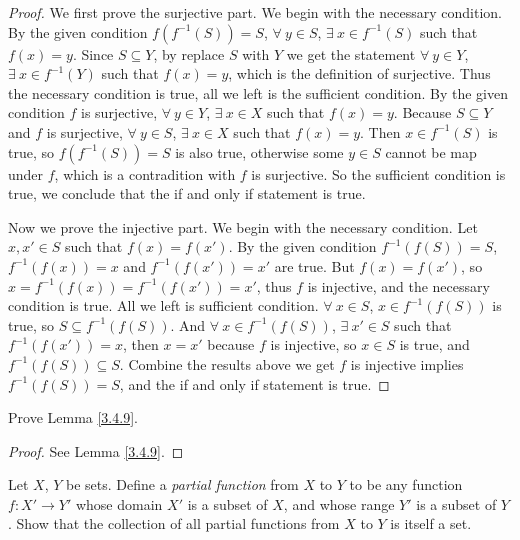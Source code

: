\begin{proof}
We first prove the surjective part.
We begin with the necessary condition.
By the given condition \(f(f^{-1}(S)) = S\), \(\forall\ y \in S\), \(\exists\ x \in f^{-1}(S)\) such that \(f(x) = y\).
Since \(S \subseteq Y\), by replace \(S\) with \(Y\) we get the statement \(\forall\ y \in Y\), \(\exists\ x \in f^{-1}(Y)\) such that \(f(x) = y\), which is the definition of surjective.
Thus the necessary condition is true, all we left is the sufficient condition.
By the given condition \(f\) is surjective, \(\forall\ y \in Y\), \(\exists\ x \in X\) such that \(f(x) = y\).
Because \(S \subseteq Y\) and \(f\) is surjective, \(\forall\ y \in S\), \(\exists\ x \in X\) such that \(f(x) = y\).
Then \(x \in f^{-1}(S)\) is true, so \(f(f^{-1}(S)) = S\) is also true, otherwise some \(y \in S\) cannot be map under \(f\), which is a contradition with \(f\) is surjective.
So the sufficient condition is true, we conclude that the if and only if statement is true.

Now we prove the injective part.
We begin with the necessary condition.
Let \(x, x' \in S\) such that \(f(x) = f(x')\).
By the given condition \(f^{-1}(f(S)) = S\), \(f^{-1}(f(x)) = x\) and \(f^{-1}(f(x')) = x'\) are true.
But \(f(x) = f(x')\), so \(x = f^{-1}(f(x)) = f^{-1}(f(x')) = x'\), thus \(f\) is injective, and the necessary condition is true.
All we left is sufficient condition.
\(\forall\ x \in S\), \(x \in f^{-1}(f(S))\) is true, so \(S \subseteq f^{-1}(f(S))\).
And \(\forall\ x \in f^{-1}(f(S))\), \(\exists\ x' \in S\) such that \(f^{-1}(f(x')) = x\), then \(x = x'\) because \(f\) is injective, so \(x \in S\) is true, and \(f^{-1}(f(S)) \subseteq S\).
Combine the results above we get \(f\) is injective implies \(f^{-1}(f(S)) = S\), and the if and only if statement is true.
\end{proof}

\begin{exercise}\label{ex 3.4.6}
Prove Lemma \ref{3.4.9}.
\end{exercise}

\begin{proof}
See Lemma \ref{3.4.9}.
\end{proof}

\begin{exercise}\label{ex 3.4.7}
Let \(X\), \(Y\) be sets.
Define a \emph{partial function} from \(X\) to \(Y\) to be any function \(f : X' \to Y'\) whose domain \(X'\) is a subset of \(X\), and whose range \(Y'\) is a subset of \(Y\).
Show that the collection of all partial functions from \(X\) to \(Y\) is itself a set.
\end{exercise}

